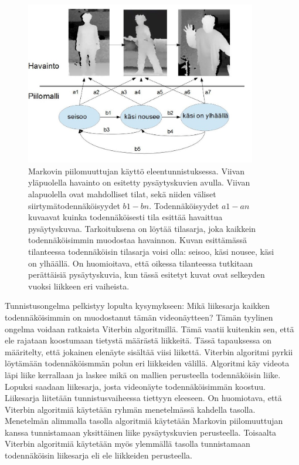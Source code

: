 \begin{figure}[htb]
  \begin{center}
    \includegraphics[width=0.9\textwidth]{HMModfcropped.jpg}
    \caption{Markovin piilomuuttujan käyttö eleentunnistuksessa. Viivan yläpuolella havainto on esitetty pysäytyskuvien avulla. Viivan alapuolella
	ovat mahdolliset tilat,	sekä niiden väliset siirtymätodennäköisyydet $b1-bn$. Todennäköisyydet $a1-an$ kuvaavat kuinka todennäköisesti tila 
	esittää havaittua pysäytyskuvaa.
	Tarkoituksena on löytää tilasarja, joka kaikkein todennäköisimmin muodostaa havainnon. Kuvan esittämässä tilanteessa todennäköisin tilasarja
	voisi olla: seisoo, käsi nousee, käsi on ylhäällä. On huomioitava, että oikessa tilanteessa tutkitaan perättäisiä pysäytyskuvia, kun
	tässä esitetyt kuvat ovat selkeyden vuoksi liikkeen eri vaiheista.}
    \label{fig:HMM}
  \end{center}
\end{figure}

Tunnistusongelma pelkistyy lopulta kysymykseen: Mikä liikesarja kaikken todennäköisimmin on muodostanut tämän videonäytteen?
Tämän tyylinen ongelma voidaan ratkaista Viterbin algoritmillä. Tämä vaatii kuitenkin sen, että ele rajataan koostumaan tietystä määrästä liikkeitä.
Tässä tapauksessa on määritelty, että jokainen elenäyte sisältää viisi liikettä.
Viterbin algoritmi pyrkii löytämään todennäköismmän polun eri liikkeiden välillä. Algoritmi käy videota läpi liike kerrallaan ja laskee mikä
on mallien perusteella todennäköisin liike. Lopuksi saadaan liikesarja, josta videonäyte todennäköisimmän koostuu.
Liikesarja liitetään tunnistusvaiheessa tiettyyn eleeseen. On huomiotava, että Viterbin algoritmiä käytetään ryhmän menetelmässä 
kahdella tasolla. Menetelmän alimmalla tasolla algoritmiä käytetään Markovin piilomuuttujan kanssa tunnistamaan yksittäinen liike pysäytyskuvien perusteella. 
Toisaalta Viterbin algoritmiä käytetään myös ylemmällä tasolla tunnistamaan todennäköisin liikesarja eli ele liikkeiden perusteella. \citep {6239185}\\

